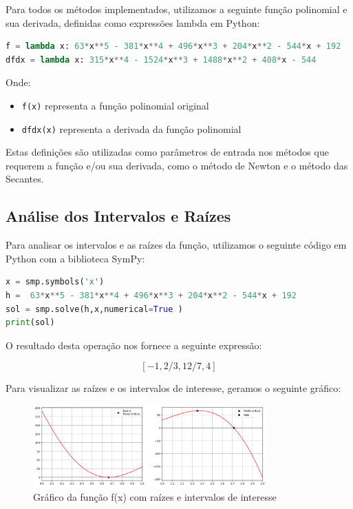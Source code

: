 \documentclass{article}
\begin{document}
Para todos os m\'{e}todos implementados, utilizamos a seguinte fun\c{c}\~{a}o polinomial e sua derivada, definidas como express\~{o}es lambda em Python:

\begin{lstlisting}[language=Python]
f = lambda x: 63*x**5 - 381*x**4 + 496*x**3 + 204*x**2 - 544*x + 192
dfdx = lambda x: 315*x**4 - 1524*x**3 + 1488*x**2 + 408*x - 544
\end{lstlisting}

Onde:
\begin{itemize}
    \item \texttt{f(x)} representa a fun\c{c}\~{a}o polinomial original
    \item \texttt{dfdx(x)} representa a derivada da fun\c{c}\~{a}o polinomial
\end{itemize}

Estas defini\c{c}\~{o}es s\~{a}o utilizadas como par\^{a}metros de entrada nos m\'{e}todos que requerem a fun\c{c}\~{a}o e/ou sua derivada, como o m\'{e}todo de Newton e o m\'{e}todo das Secantes.

\subsection{An\'{a}lise dos Intervalos e Ra\'{i}zes}

Para analisar os intervalos e as ra\'{i}zes da fun\c{c}\~{a}o, utilizamos o seguinte c\'{o}digo em Python com a biblioteca SymPy:

\begin{lstlisting}[language=Python]
x = smp.symbols('x')
h =  63*x**5 - 381*x**4 + 496*x**3 + 204*x**2 - 544*x + 192
sol = smp.solve(h,x,numerical=True )
print(sol)
\end{lstlisting}

O resultado desta opera\c{c}\~{a}o nos fornece a seguinte express\~{a}o:

\[
[-1, 2/3, 12/7, 4]
\]

Para visualizar as ra\'{i}zes e os intervalos de interesse, geramos o seguinte gr\'{a}fico:

\begin{figure}[h]
\centering
\includegraphics[width=0.8\textwidth]{output.png}
\caption{Gr\'{a}fico da fun\c{c}\~{a}o f(x) com ra\'{i}zes e intervalos de interesse}
\label{fig:funcao_grafico}
\end{figure}
\end{document}
